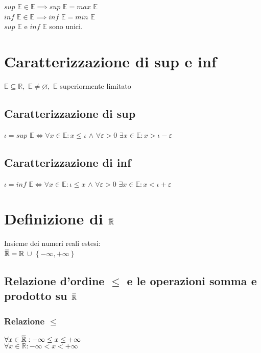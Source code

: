\documentclass[a4paper, twoside, italian, 11pt]{book}
\newcommand{\braces}[1] {\left\{#1\right\}}
\newcommand{\overbar}[1]{\mkern 1.5mu\overline{\mkern-1.5mu#1\mkern-1.5mu}\mkern 1.5mu}
\newcommand{\R}{\mathbb{R}}
\newcommand{\E}{\mathbb{E}}
\let\emptyset\varnothing
\begin{document}
\noindent
$sup$ $\E \in \E \implies sup$ $\E = max$ $\E$ \\
$inf$ $\E \in \E \implies inf$ $\E = min$ $\E$ \\
$sup$ $\E$ e $inf$ $\E$ sono unici.



\section{Caratterizzazione di sup e inf}

\noindent
$\E \subseteq \R,$ $\E \neq \emptyset,$ $\E$ superiormente limitato


\subsection{Caratterizzazione di sup}

\noindent
$\iota = sup$ $\E \iff \forall x \in \E : x \leq \iota$ $\land$ $\forall \varepsilon > 0$ $\exists x \in \E : x > \iota - \varepsilon$


\subsection{Caratterizzazione di inf}

\noindent
$\iota = inf$ $\E \iff \forall x \in \E : \iota \leq x$ $\land$ $\forall \varepsilon > 0$ $\exists x \in \E : x < \iota + \varepsilon$



\section{Definizione di $\overbar \R$}

\noindent
Insieme dei numeri reali estesi: \\
$\overbar \R = \R$ $\cup$ $\braces{-\infty, +\infty}$


\subsection {Relazione d'ordine $\leq$ e le operazioni somma e prodotto su $\overbar \R$}


\subsubsection{Relazione $\leq$}

\noindent
$\forall x \in \overbar \R: -\infty \leq x \leq +\infty$ \\
$\forall x \in \R: -\infty < x < +\infty$
\end{document}
